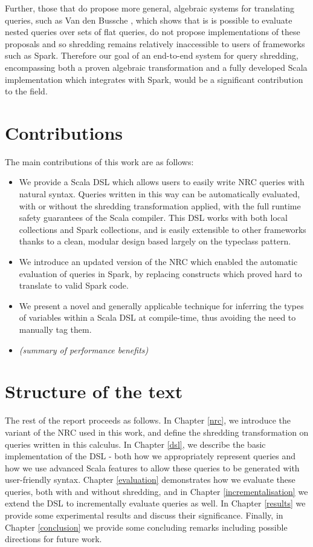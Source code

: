 {{Further, those that do propose more general, algebraic systems for translating queries, such as Van den Bussche \cite{van2001simulation}, which shows that is is possible to evaluate nested queries over sets of flat queries, do not propose implementations of these proposals and so shredding remains relatively inaccessible to users of frameworks such as Spark. Therefore our goal of an end-to-end system for query shredding, encompassing both a proven algebraic transformation and a fully developed Scala implementation which integrates with Spark, would be a significant contribution to the field.		
}



}


\section{Contributions} {
The main contributions of this work are as follows:

\begin{itemize}
\item{We provide a Scala DSL which allows users to easily write NRC queries with natural syntax. Queries written in this way can be automatically evaluated, with or without the shredding transformation applied, with the full runtime safety guarantees of the Scala compiler. This DSL works with both local collections and Spark collections, and is easily extensible to other frameworks thanks to a clean, modular design based largely on the typeclass pattern.}
\item{We introduce an updated version of the NRC which enabled the automatic evaluation of queries in Spark, by replacing constructs which proved hard to translate to valid Spark code.}
\item{We present a novel and generally applicable technique for inferring the types of variables within a Scala DSL at compile-time, thus avoiding the need to manually tag them. }
\item{\textit{(summary of performance benefits)}}
\end{itemize}
}

\section{Structure of the text} {
The rest of the report proceeds as follows. In Chapter \ref{nrc}, we introduce the variant of the NRC used in this work, and define the shredding transformation on queries written in this calculus. In Chapter \ref{dsl}, we describe the basic implementation of the DSL - both how we appropriately represent queries and how we use advanced Scala features to allow these queries to be generated with user-friendly syntax. Chapter \ref{evaluation} demonstrates how we evaluate these queries, both with and without shredding, and in Chapter \ref{incrementalisation} we extend the DSL to incrementally evaluate queries as well. In Chapter \ref{results} we provide some experimental results and discuss their significance. Finally, in Chapter \ref{conclusion} we provide some concluding remarks including possible directions for future work.
}